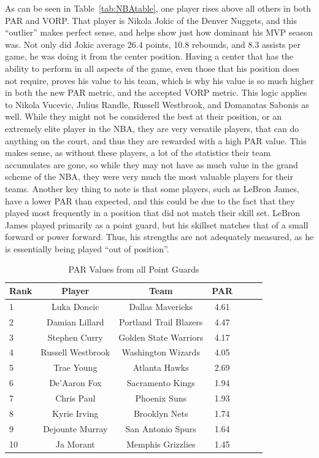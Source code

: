 \documentclass[12pt]{article}
\begin{document}
As can be seen in Table~\ref{tab:NBAtable}, one player rises above all 
others in 
both PAR and VORP. 
That player is Nikola Jokic of the 
Denver Nuggets, and this ``outlier'' makes perfect sense, and helps show 
just how dominant his MVP 
season was. Not only did Jokic average 26.4 points, 10.8 rebounds, and 
8.3 assists per game, he was 
doing it from the center position. Having a center that has the ability to 
perform in all aspects of the game, 
even those that his position does not require, proves his value to his 
team, which is why his value is so 
much higher in both the new PAR metric, and the accepted VORP metric. 
This logic applies to Nikola 
Vucevic, Julius Randle, Russell Westbrook, and Domanatas Sabonis as 
well. While they might not be 
considered the best at their position, or an extremely elite player in the 
NBA, they are very versatile players, 
that can do anything on the court, and thus they are rewarded with a high 
PAR value. This makes sense, as 
without these players, a lot of the statistics their team accumulates are 
gone, so while they may not have as 
much value in the grand scheme of the NBA, they were very much the 
most valuable players for their 
teams. Another key thing to note is that some players, such as LeBron 
James, have a lower PAR than 
expected, and this could be due to the fact that they played most 
frequently in a position that did not match 
their skill set. LeBron James played primarily as a point guard, but his 
skillset matches that of a small 
forward or power forward. Thus, his strengths are not adequately 
measured, as he is essentially being 
played ``out of position''.

\begin{table}[H]
  \caption{PAR Values from all Point Guards}
  \label{tab:PGtable}
\centering
\begin{tabular}[t]{lcccccc}
  \toprule
  Rank & Player & Team & PAR\\
  \midrule
 1 & Luka Doncic & Dallas Mavericks & 4.61\\
 2 & Damian Lillard & Portland Trail Blazers & 4.47\\
 3 & Stephen Curry & Golden State Warriors & 4.17\\
 4 & Russell Westbrook & Washington Wizards & 4.05\\
 5 & Trae Young & Atlanta Hawks & 2.69\\
 6 & De'Aaron Fox & Sacramento Kings & 1.94\\
 7 & Chris Paul & Phoenix Suns & 1.93\\
 8 & Kyrie Irving & Brooklyn Nets & 1.74\\
 9 & Dejounte Murray & San Antonio Spurs & 1.64\\
 10 & Ja Morant & Memphis Grizzlies & 1.45\\
  \bottomrule
\end{tabular}
\end{table}
\end{document}
